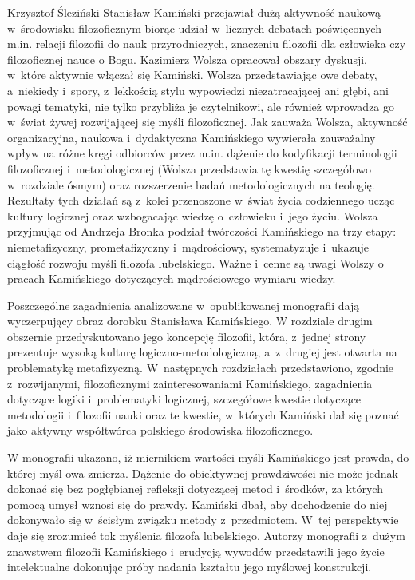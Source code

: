 \begin{recplenv}{Krzysztof Śleziński}
Stanisław Kamiński przejawiał dużą aktywność naukową w~środowisku filozoficznym biorąc udział w~licznych debatach
poświęconych m.in. relacji filozofii do nauk przyrodniczych, znaczeniu filozofii dla człowieka czy filozoficznej nauce
o Bogu. Kazimierz Wolsza opracował obszary dyskusji, w~które aktywnie włączał się Kamiński. Wolsza przedstawiając owe
debaty, a~niekiedy i~spory, z~lekkością stylu wypowiedzi niezatracającej ani głębi, ani powagi tematyki, nie tylko
przybliża je czytelnikowi, ale również wprowadza go w~świat żywej rozwijającej się myśli filozoficznej. Jak zauważa
Wolsza, aktywność organizacyjna, naukowa i~dydaktyczna Kamińskiego wywierała zauważalny wpływ na różne kręgi odbiorców
przez m.in. dążenie do kodyfikacji terminologii filozoficznej i~metodologicznej (Wolsza przedstawia tę kwestię
szczegółowo w~rozdziale ósmym) oraz rozszerzenie badań metodologicznych na teologię. Rezultaty tych działań są z~kolei
przenoszone w~świat życia codziennego ucząc kultury logicznej oraz wzbogacając wiedzę o~człowieku i~jego życiu. Wolsza
przyjmując od Andrzeja Bronka podział twórczości Kamińskiego na trzy etapy: niemetafizyczny,
prometafizyczny i~mądrościowy, systematyzuje i~ukazuje ciągłość rozwoju myśli filozofa lubelskiego.
Ważne i~cenne są uwagi Wolszy o
pracach Kamińskiego dotyczących mądrościowego wymiaru wiedzy. 

Poszczególne zagadnienia analizowane w~opublikowanej monografii dają wyczerpujący obraz dorobku Stanisława Kamińskiego.
W rozdziale drugim obszernie przedyskutowano jego koncepcję filozofii, która, z~jednej strony prezentuje wysoką kulturę
logiczno-metodologiczną, a~z~drugiej jest otwarta na problematykę metafizyczną. W~następnych rozdziałach przedstawiono,
zgodnie z~rozwijanymi, filozoficznymi zainteresowaniami Kamińskiego, zagadnienia dotyczące logiki i~problematyki
logicznej, szczegółowe kwestie dotyczące metodologii i~filozofii nauki oraz te kwestie, w~których Kamiński dał się
poznać jako aktywny współtwórca polskiego środowiska filozoficznego.

W monografii ukazano, iż miernikiem wartości myśli Kamińskiego jest prawda, do której myśl owa zmierza. Dążenie do
obiektywnej prawdziwości nie może jednak dokonać się bez pogłębianej refleksji dotyczącej metod i~środków, za których
pomocą umysł wznosi się do prawdy. Kamiński dbał, aby dochodzenie do niej dokonywało się w~ścisłym związku
metody z~przedmiotem. W~tej perspektywie daje się zrozumieć tok myślenia filozofa lubelskiego. Autorzy monografii z~dużym
znawstwem filozofii Kamińskiego i~erudycją wywodów przedstawili jego życie intelektualne dokonując próby nadania
kształtu jego myślowej konstrukcji.


\end{recplenv}
